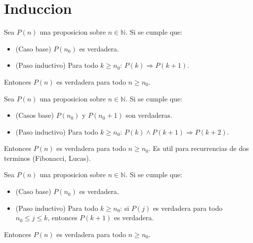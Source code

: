 \section{Induccion}

\begin{definicion}[title= Principio de induccion 1]
    Sea $P(n)$ una proposicion sobre $n\in\mathbb{N}$. Si se cumple que:
    \begin{itemize}
        \item (Caso base) $P(n_0)$ es verdadera.
        \item (Paso inductivo) Para todo $k\geq n_0$: $P(k) \Rightarrow P(k+1)$.
    \end{itemize}
    Entonces $P(n)$ es verdadera para todo $n\geq n_0$.
\end{definicion}

\begin{definicion}[title= Principio de induccion 2]
    Sea $P(n)$ una proposicion sobre $n\in\mathbb{N}$. Si se cumple que:
    \begin{itemize}
        \item (Casos base) $P(n_0)$ y $P(n_0+1)$ son verdaderas.
        \item (Paso inductivo) Para todo $k\geq n_0$: $P(k) \wedge P(k+1) \Rightarrow P(k+2)$.
    \end{itemize}
    Entonces $P(n)$ es verdadera para todo $n\geq n_0$. Es util para recurrencias de dos terminos (Fibonacci, Lucas).
\end{definicion}

\begin{definicion}[title= Induccion fuerte]
    Sea $P(n)$ una proposicion sobre $n\in\mathbb{N}$. Si se cumple que:
    \begin{itemize}
        \item (Caso base) $P(n_0)$ es verdadera.
        \item (Paso inductivo) Para todo $k\geq n_0$: si $P(j)$ es verdadera para todo $n_0\leq j\leq k$, entonces $P(k+1)$ es verdadera.
    \end{itemize}
    Entonces $P(n)$ es verdadera para todo $n\geq n_0$.
\end{definicion}